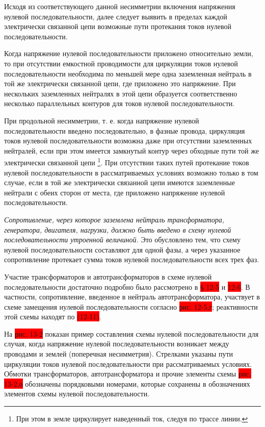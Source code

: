Исходя из соответствующего данной несимметрии включения напряжения нулевой последовательности, далее следует выявить в пределах каждой электрически связанной цепи возможные пути протекания токов нулевой последовательности.

Когда напряжение нулевой последовательности приложено относительно земли, то при отсутствии емкостной проводимости для циркуляции токов нулевой последовательности необходима по меньшей мере одна заземленная нейтраль в той же электрически связанной цепи, где приложено это напряжение. При нескольких заземленных нейтралях в этой цепи образуется соответственно несколько параллельных контуров для токов нулевой последовательности.

При продольной несимметрии, т. е. когда напряжение нулевой последовательности введено последовательно, в фазные провода, циркуляция токов нулевой последовательности возможна даже при отсутствии заземленных нейтралей, если при этом имеется замкнутый контур через обходные пути той же электрически связанной цепи \footnote{При этом в земле циркулирует наведенный ток, следуя по трассе линии.}. При отсутствии таких путей протекание токов нулевой последовательности в рассматриваемых условиях возможно только в том случае, если в той же электрически связанной цепи имеются заземленные нейтрали с обеих сторон от места, где приложено напряжение нулевой последовательности.

\textit{Сопротивление, через которое заземлена нейтраль трансформатора, генератора, двигателя, нагрузки, должно быть введено в схему нулевой последовательности утроенной величиной.} Это обусловлено тем, что схему нулевой последовательности составляют для одной фазы, а через указанное сопротивление протекает сумма токов нулевой последовательности всех трех фаз.

Участие трансформаторов и автотрансформаторов в схеме нулевой последовательности достаточно подробно было рассмотрено в \colorbox{red}{§ 12-5} и \colorbox{red}{12-6}. В частности, сопротивление, введенное в нейтраль автотрансформатора, участвует в схеме замещения нулевой последовательности согласно \colorbox{red}{рис. 12-5,г}; реактивности этой схемы находят по \colorbox{red}{(12-11)}.

На \colorbox{red}{рис. 13-2} показан пример составления схемы нулевой последовательности для случая, когда напряжение нулевой последовательности возникает между проводами и землей (поперечная несимметрия). Стрелками указаны пути циркуляции токов нулевой последовательности при рассматриваемых условиях. Обмотки трансформаторов, автотрансформатора и прочие элементы схемы \colorbox{red}{рис. 13-2,о} обозначены порядковыми номерами, которые сохранены в обозначениях элементов схемы нулевой последовательности.

